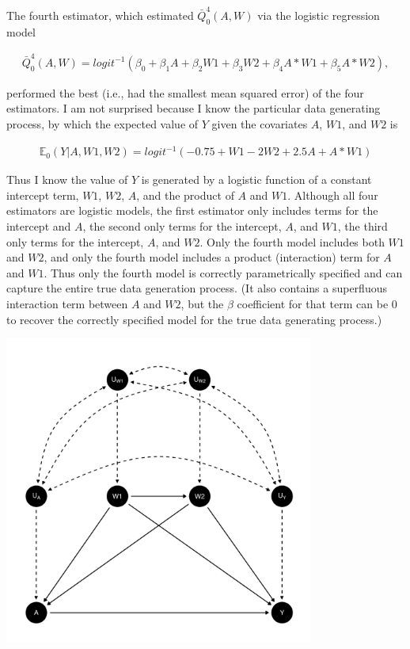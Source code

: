 \documentclass{article}\usepackage[]{graphicx}\usepackage[]{xcolor}
\newenvironment{knitrout}{}{} %
\begin{document}
The fourth estimator, which estimated $\bar{Q}^4_0(A,W)$ via the logistic regression model

\begin{align*}
\bar{Q}^4_0(A,W)=logit^{-1}(\beta_0+\beta_1A+\beta_2W1+\beta_3W2+\beta_4A*W1+\beta_5A*W2),
\end{align*}

performed the best (i.e., had the smallest mean squared error) of the four estimators.  I am not surprised because I know the particular data generating process, by which the expected value of $Y$ given the covariates $A$, $W1$, and $W2$ is

\begin{align*}
\mathbb{E}_0(Y|A,W1,W2)=logit^{-1}(-0.75+W1-2W2+2.5A+A*W1)
\end{align*}

Thus I know the value of $Y$ is generated by a logistic function of a constant intercept term, $W1$, $W2$, $A$, and the product of $A$ and $W1$. Although all four estimators are logistic models, the first estimator only includes terms for the intercept and $A$, the second only terms for the intercept, $A$, and $W1$, the third only terms for the intercept, $A$, and $W2$. Only the fourth model includes both $W1$ and $W2$, and only the fourth model includes a product (interaction) term for $A$ and $W1$. Thus only the fourth model is correctly parametrically specified and can capture the entire true data generation process. (It also contains a superfluous interaction term between $A$ and $W2$, but the $\beta$ coefficient for that term can be 0 to recover the correctly specified model for the true data generating process.)




 
 
 
 
 
 
 
 
 
 
 
 
 
 
 
 
 
 
 
 
 
 
 
 
 
 
    
\begin{knitrout}
\color{fgcolor}
\includegraphics[width=4in]{figure/unnamed-chunk-16-1} 

\end{knitrout}
      
      
      
\end{document}
